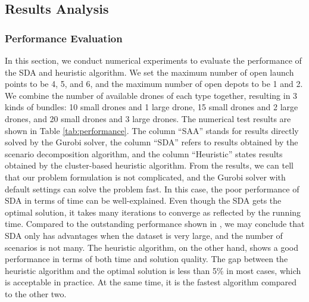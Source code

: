 \documentclass[preprint,review,11pt,authoryear]{elsarticle}
\begin{document}
\subsection{Results Analysis} \label{subsec:test_results}
\subsubsection{Performance Evaluation} \label{subsubsec:performance_eval}
In this section, we conduct numerical experiments to evaluate the performance of the SDA and heuristic algorithm. We set the maximum number of open launch points to be 4, 5, and 6, and the maximum number of open depots to be 1 and 2. We combine the number of available drones of each type together, resulting in 3 kinds of bundles: 10 small drones and 1 large drone, 15 small drones and 2 large drones, and 20 small drones and 3 large drones. The numerical test results are shown in Table \ref{tab:performance}. The column ``SAA'' stands for results directly solved by the Gurobi solver, the column ``SDA'' refers to results obtained by the scenario decomposition algorithm, and the column ``Heuristic'' states results obtained by the cluster-based heuristic algorithm. From the results, we can tell that our problem formulation is not complicated, and the Gurobi solver with default settings can solve the problem fast. In this case, the poor performance of SDA in terms of time can be well-explained. Even though the SDA gets the optimal solution, it takes many iterations to converge as reflected by the running time. Compared to the outstanding performance shown in \cite{dukkanci2023drones}, we may conclude that SDA only has advantages when the dataset is very large, and the number of scenarios is not many. The heuristic algorithm, on the other hand, shows a good performance in terms of both time and solution quality. The gap between the heuristic algorithm and the optimal solution is less than 5\% in most cases, which is acceptable in practice. At the same time, it is the fastest algorithm compared to the other two.
\end{document}

